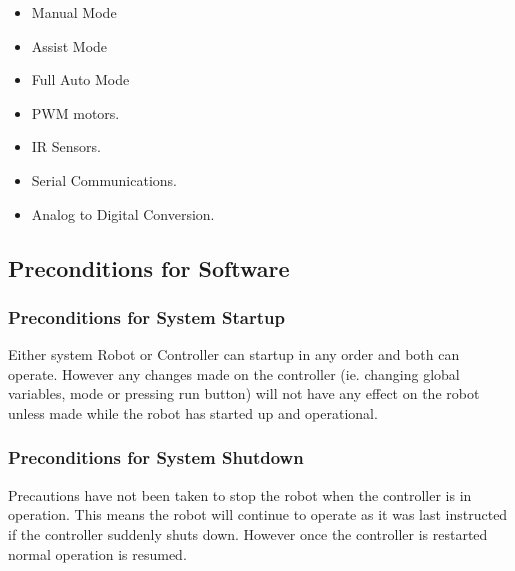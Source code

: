\documentclass[MTRX3700report.tex]{subfiles}
\begin{document}
\begin{itemize}
	\item Manual Mode
	\item Assist Mode
	\item Full Auto Mode
	\item PWM motors.
	\item IR Sensors.
	\item Serial Communications.
	\item Analog to Digital Conversion.
\end{itemize}

\subsection{Preconditions for Software}
\subsubsection{Preconditions for System Startup}
Either system Robot or Controller can startup in any order and both can operate. However any changes made on the controller (ie. changing global variables, mode or pressing run button) will not have any effect on the robot unless made while the robot has started up and operational.
\subsubsection{Preconditions for System Shutdown}
Precautions have not been taken to stop the robot when the controller is in operation. This means the robot will continue to operate as it was last instructed if the controller suddenly shuts down. However once the controller is restarted normal operation is resumed. 
\end{document}
